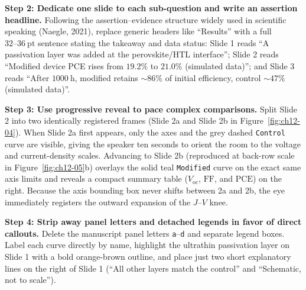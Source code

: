 \textbf{Step 2: Dedicate one slide to each sub-question and write an assertion headline.} Following the assertion--evidence structure widely used in scientific speaking (Naegle, 2021), replace generic headers like ``Results'' with a full $32\text{--}36\ \text{pt}$ sentence stating the takeaway and data status: Slide 1 reads ``A passivation layer was added at the perovskite/HTL interface''; Slide 2 reads ``Modified device PCE rises from $19.2\%$ to $21.0\%$ (simulated data)''; and Slide 3 reads ``After $1000\ \text{h}$, modified retains $\sim 86\%$ of initial efficiency, control $\sim 47\%$ (simulated data)''.

\textbf{Step 3: Use progressive reveal to pace complex comparisons.} Split Slide 2 into two identically registered frames (Slide 2a and Slide 2b in Figure~\ref{fig:ch12-04}). When Slide 2a first appears, only the axes and the grey dashed \texttt{Control} curve are visible, giving the speaker ten seconds to orient the room to the voltage and current-density scales. Advancing to Slide 2b (reproduced at back-row scale in Figure~\ref{fig:ch12-05}b) overlays the solid teal \texttt{Modified} curve on the exact same axis limits and reveals a compact summary table ($V_{\text{oc}}$, $\text{FF}$, and $\text{PCE}$) on the right. Because the axis bounding box never shifts between 2a and 2b, the eye immediately registers the outward expansion of the $J\text{--}V$ knee.

\textbf{Step 4: Strip away panel letters and detached legends in favor of direct callouts.} Delete the manuscript panel letters \texttt{a}--\texttt{d} and separate legend boxes. Label each curve directly by name, highlight the ultrathin passivation layer on Slide 1 with a bold orange-brown outline, and place just two short explanatory lines on the right of Slide 1 (``All other layers match the control'' and ``Schematic, not to scale'').

